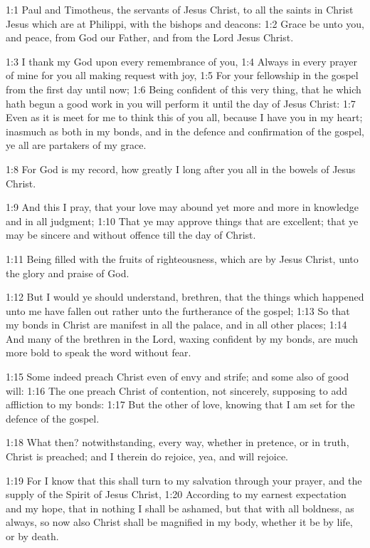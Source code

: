 

1:1 Paul and Timotheus, the servants of Jesus Christ, to all the saints in Christ Jesus which are at Philippi, with the bishops and deacons: 1:2 Grace be unto you, and peace, from God our Father, and from the Lord Jesus Christ.

1:3 I thank my God upon every remembrance of you, 1:4 Always in every prayer of mine for you all making request with joy, 1:5 For your fellowship in the gospel from the first day until now; 1:6 Being confident of this very thing, that he which hath begun a good work in you will perform it until the day of Jesus Christ: 1:7 Even as it is meet for me to think this of you all, because I have you in my heart; inasmuch as both in my bonds, and in the defence and confirmation of the gospel, ye all are partakers of my grace.

1:8 For God is my record, how greatly I long after you all in the bowels of Jesus Christ.

1:9 And this I pray, that your love may abound yet more and more in knowledge and in all judgment; 1:10 That ye may approve things that are excellent; that ye may be sincere and without offence till the day of Christ.

1:11 Being filled with the fruits of righteousness, which are by Jesus Christ, unto the glory and praise of God.

1:12 But I would ye should understand, brethren, that the things which happened unto me have fallen out rather unto the furtherance of the gospel; 1:13 So that my bonds in Christ are manifest in all the palace, and in all other places; 1:14 And many of the brethren in the Lord, waxing confident by my bonds, are much more bold to speak the word without fear.

1:15 Some indeed preach Christ even of envy and strife; and some also of good will: 1:16 The one preach Christ of contention, not sincerely, supposing to add affliction to my bonds: 1:17 But the other of love, knowing that I am set for the defence of the gospel.

1:18 What then? notwithstanding, every way, whether in pretence, or in truth, Christ is preached; and I therein do rejoice, yea, and will rejoice.

1:19 For I know that this shall turn to my salvation through your prayer, and the supply of the Spirit of Jesus Christ, 1:20 According to my earnest expectation and my hope, that in nothing I shall be ashamed, but that with all boldness, as always, so now also Christ shall be magnified in my body, whether it be by life, or by death.

